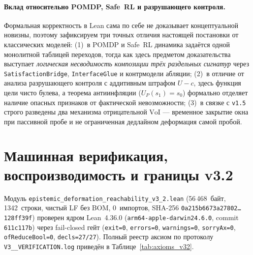 \documentclass[10pt,a4paper]{article}
\theoremstyle{cleanthm}
\theoremstyle{cleandef}
\begin{document}
\paragraph{Вклад относительно POMDP, Safe~RL и разрушающего контроля.}
Формальная корректность в Lean сама по себе не доказывает концептуальной новизны, поэтому зафиксируем три точных отличия настоящей постановки от классических моделей: (1)~в POMDP и Safe~RL динамика задаётся одной монолитной таблицей переходов, тогда как здесь предметом доказательства выступает \emph{логическая несводимость композиции трёх раздельных сигнатур} через \texttt{Satisfaction\allowbreak Bridge}, \texttt{InterfaceGlue} и контрмодели абляции; (2)~в отличие от анализа разрушающего контроля с аддитивным штрафом $U-c$, здесь функция цели чисто булева, а теорема антиинфляции ($U_P(s_1)=s_0$) формально отделяет наличие опасных признаков от фактической невозможности; (3)~в связке с \texttt{v1.5} строго разведены два механизма отрицательной $\mathrm{VoI}$ — временное закрытие окна при пассивной пробе и не ограниченная дедлайном деформация самой пробой.

\section{Машинная верификация, воспроизводимость и границы v3.2}

Модуль \texttt{epistemic\_\allowbreak deformation\_\allowbreak reachability\_\allowbreak v3\_\allowbreak 2.lean} (56\,468~байт, 1342~строки, чистый LF без BOM, 0~импортов, SHA-256 \texttt{0a215b6673a27802\ldots{}128ff39f}) проверен ядром Lean~4.36.0 (\texttt{arm64-apple-darwin24.6.0}, commit \texttt{611c117b}) через fail-closed гейт (\texttt{exit=0}, \texttt{errors=0}, \texttt{warnings=0}, \texttt{sorryAx=0}, \texttt{ofReduceBool=0}, \texttt{decls=27/27}). Полный реестр аксиом по протоколу \texttt{V3\_\_\allowbreak VERIFICATION.log} приведён в Таблице~\ref{tab:axioms_v32}.
\end{document}
